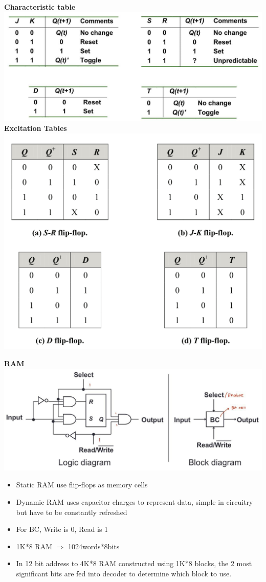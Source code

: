 \documentclass[a4paper]{article} \usepackage[backend=biber, style=numeric, sorting=none]{biblatex}
\begin{document}
\begin{multicols*}{4}
\textbf{Characteristic table}
\\\includegraphics[width=\columnwidth]{flipflops_ct}
\textbf{Excitation Tables}
\\ \includegraphics[width=1\columnwidth]{excitationTables}

\textbf{{RAM}}
\\ {\centering \includegraphics[width=\columnwidth]{staticram.jpg}}
\begin{itemize}
\item Static RAM use flip-flops as memory cells
\item Dynamic RAM uses capacitor charges to represent data, simple in circuitry but have to be constantly refreshed
\item For BC, Write is 0, Read is 1
\item 1K*8 RAM $\Rightarrow$ 1024words*8bits
\item In 12 bit address to 4K*8 RAM constructed using 1K*8 blocks, the 2 most significant bits are fed into decoder to determine which block to use.
\end{itemize}



\end{multicols*}
\end{document}
